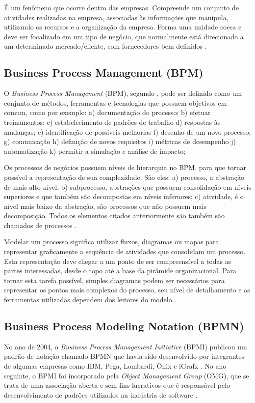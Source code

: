 \documentclass[
	12pt,				%
	openright,			%
	oneside,			%
	a4paper,			%
	chapter=TITLE,		%
	section=TITLE,		%
	english,			%
	french,				%
	spanish,			%
	brazil				%
	]{abntex2}
\begin{document}
\begin{citacao}
É um fenômeno que ocorre dentro das empresas. Compreende um conjunto de atividades realizadas na empresa, associadas às informações que manipula, utilizando os recursos e a organização da empresa. Forma uma unidade coesa e deve ser focalizado em um tipo de negócio, que normalmente está direcionado a um determinado mercado/cliente, com fornecedores bem definidos \cite[p. 538]{rozenfeldProcesso}.
\end{citacao}

\subsection{Business Process Management (BPM)}
O \textit{Business Process Management} (BPM), segundo , pode ser definido como um conjunto de métodos, ferramentas e tecnologias que possuem objetivos em comum, como por exemplo: a) documentação do processo; b) efetuar treinamentos; c) estabelecimento de padrões de trabalho d) respostas às mudanças; e) identificação de possíveis melhorias f) desenho de um novo processo; g) comunicação h) definição de novos requisitos i) métricas de desempenho j) automatização k) permitir a simulação e análise de impacto; 

Os processos de negócios possuem níveis de hierarquia no BPM, para que tornar possível a representação de sua complexidade. São eles: a) processo, a abstração de mais alto nível; b) subprocesso, abstrações que possuem consolidação em níveis superiores e que também são decompostas em níveis inferiores; c) atividade, é o nível mais baixo da abstração, são processos que não possuem mais decomposição. Todos os elementos citados anteriormente são também são chamados de processos \cite{sordiGestaoModerna}.

Modelar um processo significa utilizar fluxos, diagramas ou mapas para representar graficamente a sequência de atividades que consolidam um processo. Esta representação deve chegar a um ponto de ser compreensível a todas as partes interessadas, desde o topo até a base da pirâmide organizacional. Para tornar esta tarefa possível, simples diagramas podem ser necessários para representar os pontos mais complexos do processo, seu nível de detalhamento e as ferramentas utilizadas dependem dos leitores do modelo \cite{juniorMapeamentoGestaoProcessos}.


\subsection{Business Process Modeling Notation (BPMN)}
No ano de 2004, o \textit{Business Process Management Initiative} (BPMI) publicou um padrão de notação chamado BPMN que havia sido desenvolvido por integrantes de algumas empresas como IBM, Pega, Lombardi, Ônix e iGrafx \cite{valleBarbaraBPMN}. No ano seguinte, o BPMI foi incorporado pela \textit{Object Management Group} (OMG), que se trata de uma associação aberta e sem fins lucrativos que é responsável pelo desenvolvimento de padrões utilizados na indústria de software \cite{araujoGestao}.
\end{document}

